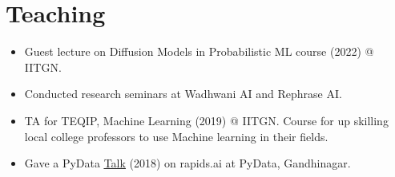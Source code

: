 \section{Teaching}
\begin{itemize}\itemsep1pt \parskip0pt 
    \item{Guest lecture on Diffusion Models in Probabilistic ML course (2022) @ IITGN.}
    \item{Conducted research seminars at Wadhwani AI and Rephrase AI.}
    \item{TA for TEQIP, Machine Learning (2019) @ IITGN. Course for up skilling local college professors to use Machine learning in their fields.}
    \item{Gave a PyData \href{https://www.youtube.com/watch?v=8PcyqzKHmnI}{\underline{Talk}} (2018) on rapids.ai at PyData, Gandhinagar.}
\end{itemize}
